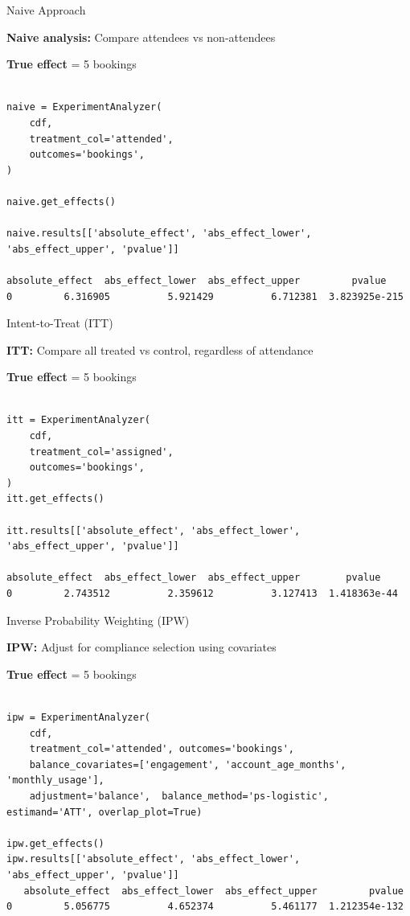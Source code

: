 \documentclass{beamer}
\begin{document}
\begin{frame}[fragile]{Naive Approach }

\textbf{Naive analysis:} Compare attendees vs non-attendees

\textbf{True effect} = 5 bookings

\begin{verbatim}

naive = ExperimentAnalyzer(
    cdf,
    treatment_col='attended',
    outcomes='bookings',
)

naive.get_effects()

naive.results[['absolute_effect', 'abs_effect_lower', 'abs_effect_upper', 'pvalue']]

absolute_effect  abs_effect_lower  abs_effect_upper         pvalue
0         6.316905          5.921429          6.712381  3.823925e-215

\end{verbatim}
\end{frame}


\begin{frame}[fragile]{Intent-to-Treat (ITT) }

\textbf{ITT:} Compare all treated vs control, regardless of attendance

\textbf{True effect} = 5 bookings

\begin{verbatim}

itt = ExperimentAnalyzer(
    cdf,
    treatment_col='assigned',
    outcomes='bookings',
)
itt.get_effects()

itt.results[['absolute_effect', 'abs_effect_lower', 'abs_effect_upper', 'pvalue']]

absolute_effect  abs_effect_lower  abs_effect_upper        pvalue
0         2.743512          2.359612          3.127413  1.418363e-44

\end{verbatim}
\end{frame}


\begin{frame}[fragile]{Inverse Probability Weighting (IPW) }

\textbf{IPW:} Adjust for compliance selection using covariates

\textbf{True effect} = 5 bookings

\begin{verbatim}

ipw = ExperimentAnalyzer(
    cdf,
    treatment_col='attended', outcomes='bookings',
    balance_covariates=['engagement', 'account_age_months', 'monthly_usage'],
    adjustment='balance',  balance_method='ps-logistic', estimand='ATT', overlap_plot=True)

ipw.get_effects()
ipw.results[['absolute_effect', 'abs_effect_lower', 'abs_effect_upper', 'pvalue']]
   absolute_effect  abs_effect_lower  abs_effect_upper         pvalue
0         5.056775          4.652374          5.461177  1.212354e-132

\end{verbatim}
\end{frame}
\end{document}
